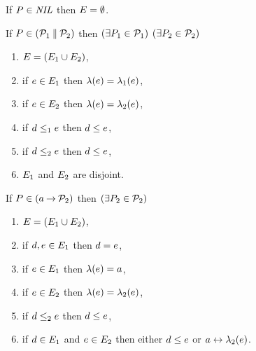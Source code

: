 \begin{definition} %
  \label{def:pomset-semantics}

  \noindent
  If $P\in\textnormal{\textit{NIL}}$ then $E = \emptyset$.

  \noindent
  If $P \in (\mathcal{P}_1\mathbin{\parallel}\mathcal{P}_2)$ then  
  $(\exists P_1\in\mathcal{P}_1)$ $(\exists P_2\in\mathcal{P}_2)$
  \begin{enumerate}
  \item \label{par-E}
    $E = (E_1\cup E_2)$,
  \item \label{par-lambda1}
    if $e\in E_1$ then $\lambda(e) = \lambda_1(e)$, 
  \item \label{par-lambda2}
    if $e\in E_2$ then $\lambda(e) = \lambda_2(e)$,
  \item \label{par-le1}
    if $d\le_1e$ then $d\le e$, 
  \item \label{par-le2}
    if $d\le_2e$ then $d\le e$, 
    \setcounter{pomsetParCount}{\value{enumi}}
  \item \label{par-disjoint}
    $E_1$ and $E_2$ are disjoint.
    \setcounter{pomsetParDisjointCount}{\value{enumi}}
  \end{enumerate}

  \noindent
  If $\aPS \in (\aAct\sPREFIX\aPSS_2)$ then
  $(\exists P_2\in\mathcal{P}_2)$
  \begin{enumerate}
  \item \label{pre-E}
    $E=(E_1 \cup E_2)$,
  \item \label{pre-unique}
    if $d,e\in E_1$ then $d=e$,
  \item \label{pre-lambda1}
    if $e\in E_1$ then $\lambda(e) = a$,
  \item \label{pre-lambda2}
    if $e\in E_2$ then $\lambda(e) = \lambda_2(e)$,
  \item \label{pre-le2}
    if $d\le_2e$ then $d\le e$, 
  \item
    \label{pre-reorder}
    if $d\in E_1$ and $e\in E_2$ then either $d\leq e$ or $a\mathrel\leftrightarrow\lambda_2(e)$.
    \setcounter{pomsetPrefixOrderCount}{\value{enumi}}
  \end{enumerate}
\end{definition}
